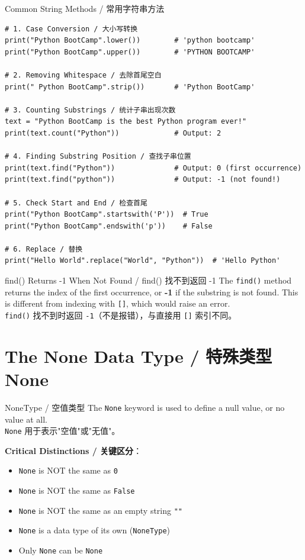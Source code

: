 \documentclass[11pt,a4paper]{article}
\begin{document}
\begin{examplebox}{Common String Methods / 常用字符串方法}
\begin{lstlisting}
# 1. Case Conversion / 大小写转换
print("Python BootCamp".lower())        # 'python bootcamp'
print("Python BootCamp".upper())        # 'PYTHON BOOTCAMP'

# 2. Removing Whitespace / 去除首尾空白
print(" Python BootCamp".strip())       # 'Python BootCamp'

# 3. Counting Substrings / 统计子串出现次数
text = "Python BootCamp is the best Python program ever!"
print(text.count("Python"))             # Output: 2

# 4. Finding Substring Position / 查找子串位置
print(text.find("Python"))              # Output: 0 (first occurrence)
print(text.find("python"))              # Output: -1 (not found!)

# 5. Check Start and End / 检查首尾
print("Python BootCamp".startswith('P'))  # True
print("Python BootCamp".endswith('p'))    # False

# 6. Replace / 替换
print("Hello World".replace("World", "Python"))  # 'Hello Python'
\end{lstlisting}
\end{examplebox}

\begin{warning}{find() Returns -1 When Not Found / find() 找不到返回 -1}
    The \texttt{find()} method returns the index of the first occurrence, or \textbf{-1} if the substring is not found. This is different from indexing with \texttt{[]}, which would raise an error. \\
    \texttt{find()} 找不到时返回 \texttt{-1}（不是报错），与直接用 \texttt{[]} 索引不同。
\end{warning}

\section{The None Data Type / 特殊类型 None}

\begin{concept}{NoneType / 空值类型}
    The \texttt{None} keyword is used to define a null value, or no value at all. \\
    \texttt{None} 用于表示"空值"或"无值"。

    \textbf{Critical Distinctions / 关键区分}：
    \begin{itemize}
        \item \texttt{None} is NOT the same as \texttt{0}
        \item \texttt{None} is NOT the same as \texttt{False}
        \item \texttt{None} is NOT the same as an empty string \texttt{""}
        \item \texttt{None} is a data type of its own (\texttt{NoneType})
        \item Only \texttt{None} can be \texttt{None}
    \end{itemize}
\end{concept}
\end{document}
